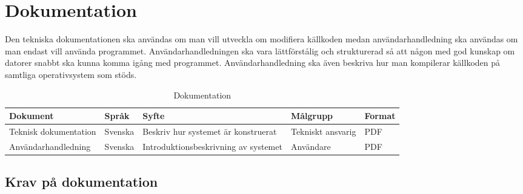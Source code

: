 \section{Dokumentation}
Den tekniska dokumentationen ska användas om man vill utveckla om modifiera källkoden medan användarhandledning ska användas om man endast vill använda programmet. Användarhandledningen ska vara lättförstålig och strukturerad så att någon med god kunskap om datorer snabbt ska kunna komma igång med programmet. Användarhandledning ska även beskriva hur man kompilerar källkoden på samtliga operativsystem som stöds.
	\begin{table}[h]
	\centering
		\begin{tabularx}{\textwidth}{| l | l | X | l | l |}
			\hline
			\textbf{Dokument} & \textbf{Språk} & \textbf{Syfte} & \textbf{Målgrupp} & \textbf{Format} \\
			\hline
			Teknisk dokumentation & Svenska & Beskriv hur systemet är konstruerat & Tekniskt ansvarig & PDF \\
			\hline
			Användarhandledning & Svenska & Introduktionsbeskrivning av systemet & Användare & PDF \\
			\hline
		\end{tabularx}
	\caption{Dokumentation} \label{dokumentation:tabell}
	\end{table}

\subsection{Krav på dokumentation}
\begin{LIPSkravlista}
\end{LIPSkravlista}
